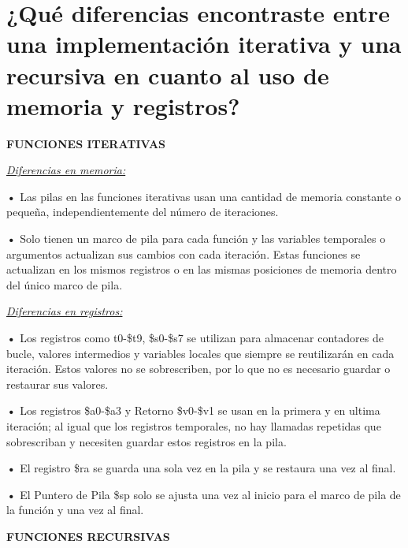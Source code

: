 \documentclass{article}
\begin{document}
\quad
\newpage

\section{¿Qué diferencias encontraste entre una implementación iterativa y una recursiva en cuanto al uso de memoria y registros?}

\quad

\textbf{FUNCIONES ITERATIVAS}

\quad

\textit{\underline{Diferencias en memoria: }}

\quad

\textbf{•   } { Las pilas en las funciones iterativas usan una cantidad de memoria constante o pequeña, independientemente del número de iteraciones.}

\quad

\textbf{•   } { Solo tienen un marco de pila para cada función y las variables temporales o argumentos actualizan sus cambios con cada iteración. Estas funciones se actualizan en los mismos registros o en las mismas posiciones de memoria dentro del único marco de pila.}


\quad

\textit{\underline{Diferencias en registros: }}


\quad

\textbf{•   } { Los registros como t0-\$t9, \$s0-\$s7 se utilizan para almacenar contadores de bucle, valores intermedios y variables locales que siempre se reutilizarán en cada iteración. Estos valores no se sobrescriben, por lo que no es necesario guardar o restaurar sus valores.}

\quad

\textbf{•   } { Los registros \$a0-\$a3 y Retorno \$v0-\$v1 se usan en la primera y en ultima iteración; al igual que los registros temporales, no hay llamadas repetidas que sobrescriban y necesiten guardar estos registros en la pila.}

\quad

\textbf{•   } { El registro \$ra se guarda una sola vez en la pila y se restaura una vez al final.}

\quad

\textbf{•   } { El Puntero de Pila \$sp solo se ajusta una vez al inicio para el marco de pila de la función y una vez al final.}


\quad

\textbf{FUNCIONES RECURSIVAS}

\quad
\end{document}

